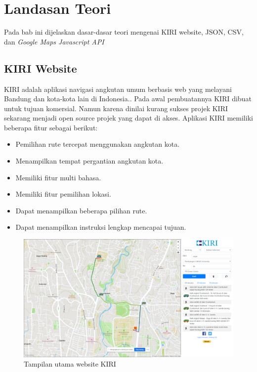 
\chapter{Landasan Teori}
\label{chap:teori}
Pada bab ini dijelaskan dasar-dasar teori mengenai KIRI website, JSON, CSV, dan \textit{Google Maps Javascript API}

\section{KIRI Website }
\label{sec:KIRI} 
KIRI adalah aplikasi navigasi angkutan umum berbasis web yang melayani Bandung dan kota-kota lain di Indonesia.\cite{pascal:17:KIRI}.
Pada awal pembuatannya KIRI dibuat untuk tujuan komersial. Namun karena dinilai kurang sukses projek KIRI sekarang menjadi open source projek yang dapat di akses. Aplikasi KIRI memiliki beberapa fitur sebagai berikut:
\begin{itemize}
	\item Pemilihan rute tercepat menggunakan angkutan kota.
	\item Menampilkan tempat pergantian angkutan kota.
	\item Memiliki fitur multi bahasa.
	\item Memiliki fitur pemilihan lokasi.
	\item Dapat menampilkan beberapa pilihan rute.
	\item Dapat menampilkan instruksi lengkap  mencapai tujuan.
\end{itemize}

\begin{figure}[H]
	\centering
	\includegraphics[scale=0.3]{Gambar/kiri-example-1}
	\caption{Tampilan utama website KIRI}
	\label{fig:my_label}
\end{figure}




